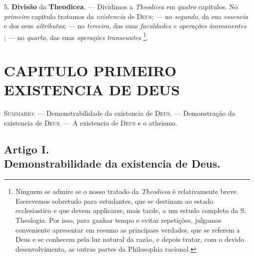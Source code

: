  5. \textbf{Divisão} da \textbf{Theodicea}. --- Dividimos a \emph{Theodicea} em \emph{quatro} capitulos. No \emph{primeiro} capitulo tratamos da \emph{existencia} de \textsc{Deus}; --- no \emph{segundo}, da sua \emph{essencia} e dos seus \emph{aítributos}; --- no \emph{terceiro}, das suas \emph{faculdades e operações àmmanentes} ; --- no \emph{quarto}, das suas \emph{operações transeuntes} \footnote{Ninguem se admire se o nosso tratado da \emph{Theodicea} é relativamente breve. Eserevemos sobretudo para estudantes, que se destinam ao estado ecclesiastico e que devem applicarse, mais tarde, a um estudo completo da S. Theologia. Por isso, para ganhar tempo e evitar repetições, julgamos conveniente apresentar em resumo as principaes verdades, que se referem a Deus e se conhecem pela luz natural da razão, e depois tratar, com o devido desenvolvimento, as outras partes da Philosophia racional.}.


\chapter*{CAPITULO PRIMEIRO\\[0.3em]\large EXISTENCIA DE DEUS}

{\small\noindent\textsc{Summario}: --- Demonstrabilidade da existencia de \textsc{Deus}. --- Demonstração da existencia de \textsc{Deus}. --- A existencia de \textsc{Deus} e o atheismo.\par}


\section*{Artigo I.\\ Demonstrabilidade da existencia de Deus.}

